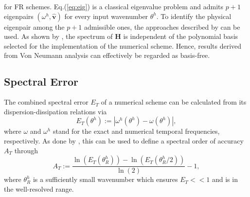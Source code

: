 \documentclass[preprint,12pt]{elsarticle}
\begin{document}
for FR schemes. Eq.(\ref{eq:eig}) is a classical eigenvalue problem and admits $p+1$ eigenpairs $(\omega^h, \hat{\mathbf{v}})$ for every input wavenumber $\theta^h$. To identify the physical eigenpair among the $p+1$ admissible ones, the approaches described by \cite{vincent2011insights,moura2015linear} can be used. As shown by \cite{huynh2007flux}, the spectrum of $\mathbf{H}$ is independent of the polynomial basis selected for the implementation of the numerical scheme. Hence, results derived from Von Neumann analysis can effectively be regarded as basis-free.

\subsection{Spectral Error}
The combined spectral error $E_T$ of a numerical scheme can be calculated from its dispersion-dissipation relations via
\begin{equation}
    E_T(\theta^h) := |\omega^h(\theta^h) - \omega(\theta^h)|,
\end{equation}
where $\omega$ and $\omega^h$ stand for the exact and numerical temporal frequencies, respectively. As done by \cite{vincent2011insights, huynh2007flux}, this can be used to define a spectral order of accuracy $A_T$ through
\begin{equation}
    A_T := \frac{\ln(E_T(\theta_R^h)) - \ln(E_T(\theta^h_R / 2))}{\ln(2)} - 1,
\end{equation}
where $\theta^h_R$ is a sufficiently small wavenumber which ensures $E_T << 1$ and is in the well-resolved range.
\end{document}
